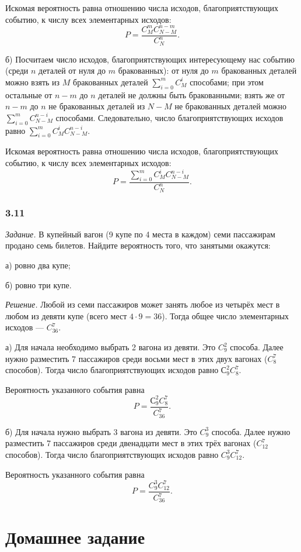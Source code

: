 \documentclass{book}
\begin{document}
Искомая вероятность равна отношению числа исходов, благоприятствующих событию, к числу всех элементарных исходов:
$$P =
\frac{C_M^m C_{N-M}^{n-m}}{C_N^n}.$$

б) Посчитаем число исходов,
благоприятствующих интересующему нас событию
(среди $n$ деталей от нуля до $m$ бракованных):
от нуля до $m$ бракованных деталей можно взять из $M$ бракованных деталей $ \sum \limits_{i=0}^m C_M^i$ способами;
при этом остальные от $n - m$ до $n$ деталей не должны быть бракованными;
взять же от $n - m$ до $n$ не бракованных деталей из $N - M$ не бракованных деталей можно $ \sum \limits_{i=0}^m C_{N-M}^{n-i}$ способами.
Следовательно, число благоприятствующих исходов равно $ \sum \limits_{i=0}^m C_M^i C_{N-M}^{n-i}$.

Искомая вероятность равна отношению числа исходов, благоприятствующих событию, к числу всех элементарных исходов:
$$P =
\frac{ \sum \limits_{i=0}^m C_M^i C_{N-M}^{n-i}}{C_N^n}.$$

\subsubsection*{3.11}

\textit{Задание.} В купейный вагон (9 купе по 4 места в каждом) семи пассажирам продано семь билетов.
Найдите вероятность того, что занятыми окажутся:

а) ровно два купе;

б) ровно три купе.

\textit{Решение.}
Любой из семи пассажиров может занять любое из четырёх мест в любом из девяти купе (всего мест $4 \cdot 9 = 36$).
Тогда общее число элементарных исходов --- $C_{36}^7$.

а) Для начала необходимо выбрать 2 вагона из девяти.
Это $C_9^2$ способа.
Далее нужно разместить 7 пассажиров среди восьми мест в этих двух вагонах ($C_{8}^7$ способов).
Тогда число благоприятствующих исходов равно $С_9^2 C_8^7$.

Вероятность указанного события равна
$$P =
\frac{С_9^2 C_8^7}{C_{36}^7}.$$

б) Для начала нужно выбрать 3 вагона из девяти.
Это $C_9^3$ способа.
Далее нужно разместить 7 пассажиров среди двенадцати мест в этих трёх вагонах ($C_{12}^7$ способов).
Тогда число благоприятствующих исходов равно $C_9^3 C_{12}^7$.

Вероятность указанного события равна
$$P =
\frac{C_9^3 C_{12}^7}{C_{36}^7}.$$

\section*{Домашнее задание}
\end{document}
